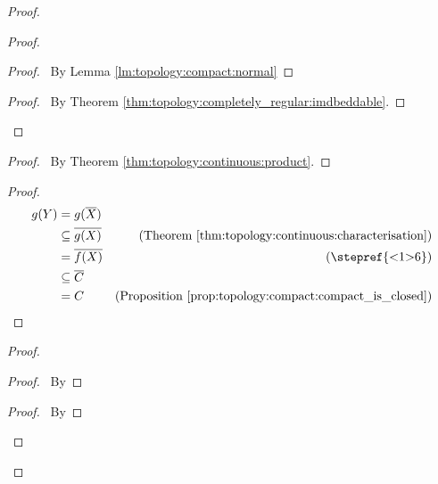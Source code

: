 \documentclass{report}
\let\qed\relax
\theoremstyle{definition}
\begin{document}
  \begin{proof}
    \pf
    \begin{proof}
      \begin{proof}
        \pf\ By Lemma \ref{lm:topology:compact:normal}
      \end{proof}
      \qedstep
      \begin{proof}
        \pf\ By Theorem \ref{thm:topology:completely_regular:imdbeddable}.
      \end{proof}
    \end{proof}
    \begin{proof}
      \pf\ By Theorem \ref{thm:topology:continuous:product}.
    \end{proof}
    \begin{proof}
      \pf
      \begin{align*}
        g(Y) & = g(\overline{X}) \\
        & \subseteq \overline{g(X)} & (\text{Theorem \ref{thm:topology:continuous:characterisation}})\\
        & = \overline{f(X)} & (\text{\stepref{<1>6}})\\
        & \subseteq \overline{C} \\
        & = C & (\text{Proposition \ref{prop:topology:compact:compact_is_closed}})
      \end{align*}
    \end{proof}
    \begin{proof}
      \begin{proof}
        \pf\ By 
      \end{proof}
      \begin{proof}
        \pf\ By 
      \end{proof}
    \end{proof}
    \qed
  \end{proof}
\end{document}

